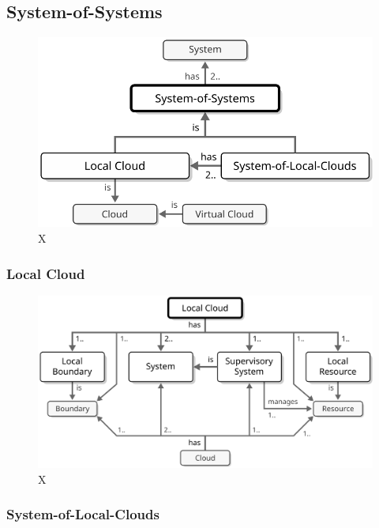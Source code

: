 \newpage

\subsection{System-of-Systems}
\label{sec:reference-model:system-of-systems}

\begin{figure}[ht!]
  \centering
  \includegraphics[scale=0.9]{figures/system-of-systems}
  \caption{
    X
  }
  \label{fig:system-of-systems}
\end{figure}

\subsubsection{Local Cloud}
\label{sec:reference-model:system-of-systems:local-cloud}

\begin{figure}[ht!]
  \centering
  \includegraphics[scale=0.9]{figures/local-cloud}
  \caption{
    X
  }
  \label{fig:local-cloud}
\end{figure}

\subsubsection{System-of-Local-Clouds}
\label{sec:reference-model:system-of-systems:system-of-local-clouds}

